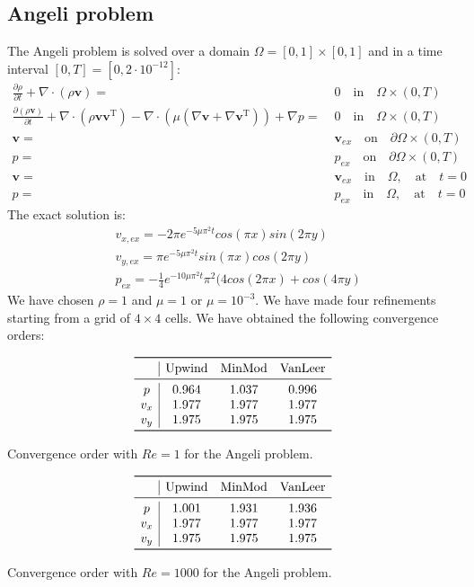 \documentclass[11pt, a4paper]{article}
\theoremstyle{definition}
\begin{document}
\subsection{Angeli problem}
The Angeli problem is solved over a domain $\Omega = [0,1] \times [0,1]$ and in 
a time interval $[0, T] = [0, 2 \cdot 10^{-12}]$:
\begin{align*}
\frac{\partial \rho}{\partial t} + \nabla \cdot (\rho \mathbf{v}) 
=& \; 0 \quad \text{in} \quad \Omega \times (0, T)\\
\frac{\partial (\rho \mathbf{v})}{\partial t} + \nabla \cdot (\rho \mathbf{v} 
\mathbf{v^\mathrm{T}}) - \nabla \cdot (\mu 
(\nabla 
\mathbf{v} + \nabla \mathbf{v}^\mathrm{T})) + 
\nabla p =& \; 0 \quad \text{in} \quad \Omega \times (0, T)\\
\mathbf{v} =& \; \mathbf{v}_{ex} \quad \text{on} \quad \partial \Omega \times 
(0, T)\\
p =& \; p_{ex} \quad \text{on} \quad \partial \Omega \times (0, T)\\
\mathbf{v} =& \; \mathbf{v}_{ex} \quad \text{in} \quad \Omega, \quad 
\text{at} \quad t=0\\
p =& \; p_{ex} \quad \text{in} \quad \Omega, \quad 
\text{at} \quad t=0
\end{align*}
The exact solution is:
\begin{align*}
&v_{x,ex} = -2 \pi e^{-5 \mu \pi^2 t} cos(\pi x) sin(2 \pi y)\\
&v_{y,ex} = \pi e^{-5 \mu \pi^2 t} sin(\pi x) cos(2 \pi y)\\
&p_{ex} = -\frac{1}{4} e^{-10 \mu \pi^2 t} \pi^2 (4 cos(2 \pi x) + cos(4 \pi y)
\end{align*}
We have chosen $\rho = 1$ and $\mu = 1$ or $ \mu = 10^{-3}$.
We have made four refinements starting from a grid of $4 \times 4$ cells.
We have obtained the following convergence orders:
\begin{table}[h]
	\centering
	\[
	\begin{array}{c|ccc}
	\toprule
	& \text{Upwind} & \text{MinMod} & \text{VanLeer} \\ 
	\midrule
	p & 0.964 & 1.037 & 0.996\\
	v_x & 1.977 & 1.977 & 1.977\\
	v_y & 1.975 & 1.975 & 1.975\\
	\bottomrule
	\end{array}
	\]
	\caption{Convergence order with $Re=1$ for the Angeli problem.}
	\label{tab:ang_lre}
	
	\[
	\begin{array}{c|ccc}
	\toprule
	& \text{Upwind} & \text{MinMod} & \text{VanLeer} \\ 
	\midrule
	p & 1.001 & 1.931 & 1.936\\
	v_x & 1.977 & 1.977 & 1.977\\
	v_y & 1.975 & 1.975 & 1.975\\
	\bottomrule
	\end{array}
	\]
	\caption{Convergence order with $Re = 1000$ for the Angeli problem.}
	\label{tab:ang_hre}
\end{table}
\end{document}

